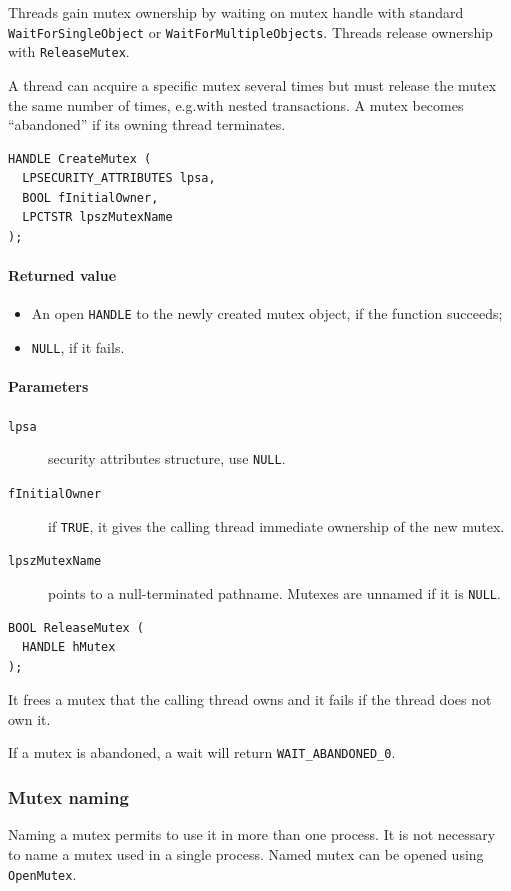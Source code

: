 Threads gain mutex ownership by waiting on mutex handle with standard \texttt{WaitForSingleObject} or \texttt{WaitForMultipleObjects}. Threads release ownership with \texttt{ReleaseMutex}.

A thread can acquire a specific mutex several times but must release the mutex the same number of times, e.g.\@ with nested transactions. A mutex becomes ``abandoned'' if its owning thread terminates.

\begin{verbatim}
HANDLE CreateMutex (
  LPSECURITY_ATTRIBUTES lpsa,
  BOOL fInitialOwner,
  LPCTSTR lpszMutexName
);
\end{verbatim}

\paragraph{Returned value}
\begin{itemize}
\item An open \texttt{HANDLE} to the newly created mutex object, if the function succeeds;
\item \texttt{NULL}, if it fails.
\end{itemize}

\paragraph{Parameters}
\begin{description}
\item [\texttt{lpsa}] security attributes structure, use \texttt{NULL}.
\item [\texttt{fInitialOwner}] if \texttt{TRUE}, it gives the calling thread immediate ownership of the new mutex.
\item [\texttt{lpszMutexName}] points to a null-terminated pathname. Mutexes are unnamed if it is \texttt{NULL}.
\end{description}

\begin{verbatim}
BOOL ReleaseMutex (
  HANDLE hMutex
);
\end{verbatim}
It frees a mutex that the calling thread owns and it fails if the thread does not own it.

If a mutex is abandoned, a wait will return \texttt{WAIT\_ABANDONED\_0}.

\subsubsection{Mutex naming}
Naming a mutex permits to use it in more than one process. It is not necessary to name a mutex used in a single process. Named mutex can be opened using \texttt{OpenMutex}.

